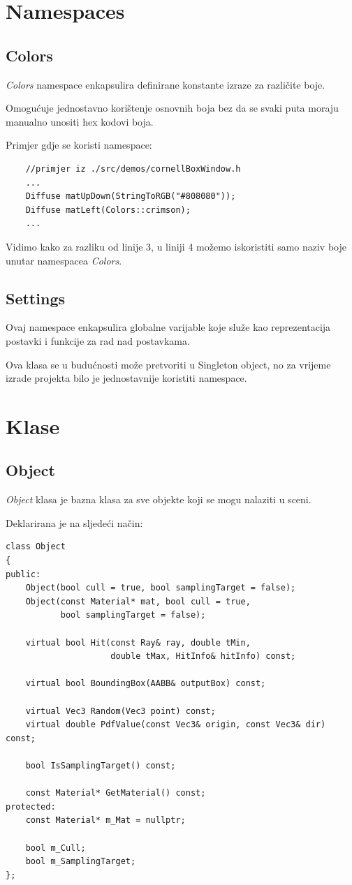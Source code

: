 \documentclass[
12pt, %
oneside, %
english, %
singlespacing, %
parskip, %
headsepline, %
chapterinoneline, %
consistentlayout, %
]{MastersDoctoralThesis} %
\begin{document}
\section{Namespaces}

\subsection*{Colors}
\emph{Colors} namespace enkapsulira definirane konstante izraze za različite boje.

Omogućuje jednostavno korištenje osnovnih boja bez da se svaki puta moraju manualno unositi hex
kodovi boja.

Primjer gdje se koristi namespace:
\begin{verbatim}
    //primjer iz ./src/demos/cornellBoxWindow.h
    ...
    Diffuse matUpDown(StringToRGB("#808080"));
    Diffuse matLeft(Colors::crimson);
    ...
\end{verbatim}
Vidimo kako za razliku od linije 3, u liniji 4 možemo iskoristiti samo naziv boje unutar namespacea
\emph{Colors}.

\subsection*{Settings}
Ovaj namespace enkapsulira globalne varijable koje služe kao reprezentacija postavki i funkcije
za rad nad postavkama.

Ova klasa se u budućnosti može pretvoriti u Singleton object, no za vrijeme izrade projekta bilo
je jednostavnije koristiti namespace.

\section{Klase}

\subsection*{Object}
\emph{Object} klasa je bazna klasa za sve objekte koji se mogu nalaziti u sceni.

Deklarirana je na sljedeći način:
\begin{verbatim}
class Object
{
public:
	Object(bool cull = true, bool samplingTarget = false);
	Object(const Material* mat, bool cull = true, 
	       bool samplingTarget = false);

	virtual bool Hit(const Ray& ray, double tMin, 
	                 double tMax, HitInfo& hitInfo) const;

	virtual bool BoundingBox(AABB& outputBox) const;

	virtual Vec3 Random(Vec3 point) const;
	virtual double PdfValue(const Vec3& origin, const Vec3& dir) const;

	bool IsSamplingTarget() const;

	const Material* GetMaterial() const;
protected:
	const Material* m_Mat = nullptr;

	bool m_Cull;
	bool m_SamplingTarget;
};
\end{verbatim}
\end{document}
